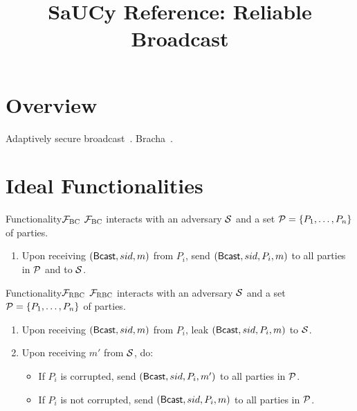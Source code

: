 \documentclass{llncs}
\title{SaUCy Reference: Reliable Broadcast}
\author{}
\institute{}
\begin{document}
\maketitle

\section{Overview}

Adaptively secure broadcast~\cite{garay2011adaptively}. Bracha~\cite{bracha1987asynchronous}.

\section{Ideal Functionalities}

\begin{boxdef}{Functionality}{$\mathcal{{F}}_{\textsc{BC}}$}
  $\mathcal{{F}}_{\textsc{BC}}$ interacts with an adversary $\mathcal{{S}}$ and a set $\mathcal{{P}} = \{
  P_1, \ldots, P_n \}$ of parties.
  \begin{enumerate}
    \item Upon receiving $({\sf Bcast}, sid, m)$ from $P_i$, send $({\sf Bcast},
  sid, P_i, m)$ to all parties in $\mathcal{{P}}$ and to $\mathcal{{S}}$.
  \end{enumerate}
\end{boxdef}


\begin{boxdef}{Functionality}{$\mathcal{{F}}_{\textsc{RBC}}$}
  $\mathcal{{F}}_{\textsc{RBC}}$ interacts with an adversary $\mathcal{{S}}$ and a set $\mathcal{{P}} = \{
  P_1, \ldots, P_n \}$ of parties.
  \begin{enumerate}
    \item Upon receiving $({\sf Bcast}, sid, m)$ from $P_i$, leak $({\sf Bcast},
  sid, P_i, m)$ to $\mathcal{{S}}$.
  
    \item Upon receiving $m'$ from $\mathcal{{S}}$, do:
    
    \begin{itemize}
      \item If $P_i$ is corrupted, send $({\sf Bcast}, sid, P_i, m')$ to all
  parties in $\mathcal{{P}}$.
  
      \item If $P_i$ is not corrupted, send $({\sf Bcast}, sid, P_i, m)$ to all
  parties in $\mathcal{{P}}$.
    \end{itemize}
  \end{enumerate}
\end{boxdef}
\end{document}
